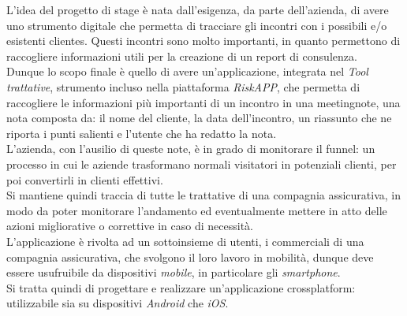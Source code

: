 L'idea del progetto di stage è nata dall'esigenza, da parte dell'azienda, di avere uno strumento digitale che permetta di tracciare gli incontri con i possibili e/o esistenti \glspl{cliente}\glsoccur.
Questi incontri sono molto importanti, in quanto permettono di raccogliere informazioni utili per la creazione di un report di consulenza.\\
Dunque lo scopo finale è quello di avere un'applicazione, integrata nel \emph{Tool trattative}, strumento incluso nella piattaforma \emph{RiskAPP}, che permetta di raccogliere le informazioni più importanti di un incontro in una \gls{meetingnote}\glsoccur, una nota composta da: il nome del \gls{cliente}\glsoccur, la data dell'incontro, un riassunto che ne riporta i punti salienti e l'utente che ha redatto la nota.\\
L'azienda, con l'ausilio di queste note, è in grado di monitorare il \gls{funnel}\glsoccur: un processo in cui le aziende trasformano normali visitatori in potenziali clienti, per poi convertirli in clienti effettivi. \\
Si mantiene quindi traccia di tutte le trattative di una compagnia assicurativa, in modo da poter monitorare l'andamento ed eventualmente mettere in atto delle azioni migliorative o correttive in caso di necessità.\\
L'applicazione è rivolta ad un sottoinsieme di utenti, i commerciali di una compagnia assicurativa, che svolgono il loro lavoro in mobilità, dunque deve essere usufruibile da dispositivi \emph{mobile}, in particolare gli \emph{smartphone}.\\
Si tratta quindi di progettare e realizzare un'applicazione \gls{crossplatform}\glsoccur: utilizzabile sia su dispositivi \emph{Android} che \emph{iOS}.


    
    
    
    
    
